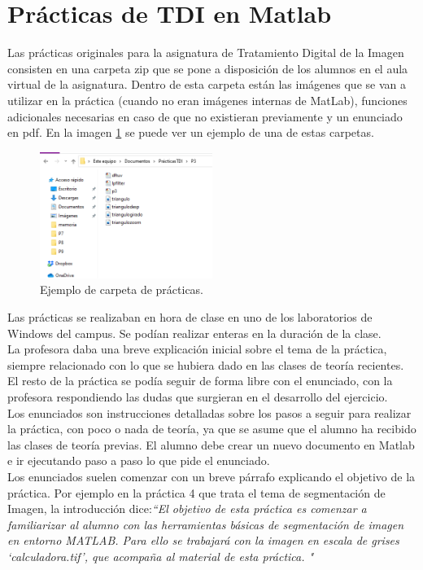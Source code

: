 \documentclass[a4paper,12pt]{report}
\begin{document}
\section{Prácticas de TDI en Matlab}


Las prácticas originales para la asignatura de Tratamiento Digital de la Imagen consisten en una carpeta zip que se pone a disposición de los alumnos en el aula virtual de la asignatura. Dentro de esta carpeta están las imágenes que se van a utilizar en la práctica (cuando no eran imágenes internas de MatLab), funciones adicionales necesarias en caso de que no existieran previamente y un enunciado en pdf. En la imagen \ref{carpetapracticas} se puede ver un ejemplo de una de estas carpetas.
 
\begin{figure}[h]
\centering
\includegraphics[width=0.5\textwidth]{imagenes/carpetapracticas}
\caption{Ejemplo de carpeta de prácticas.}
\label{carpetapracticas}
\end{figure}

Las prácticas se realizaban en hora de clase en uno de los laboratorios de Windows del campus. Se podían realizar enteras en la duración de la clase. \\

La profesora daba una breve explicación inicial sobre el tema de la práctica, siempre relacionado con lo que se hubiera dado en las clases de teoría recientes. El resto de la práctica se podía seguir de forma libre con el enunciado, con la profesora respondiendo las dudas que surgieran en el desarrollo del ejercicio. \\

Los enunciados son instrucciones detalladas sobre los pasos a seguir para realizar la práctica, con poco o nada de teoría, ya que se asume que el alumno ha recibido las clases de teoría previas. El alumno debe crear un nuevo documento en Matlab e ir ejecutando paso a paso lo que pide el enunciado. \\

Los enunciados suelen comenzar con un breve párrafo explicando el objetivo de la práctica. Por ejemplo en la práctica 4 que trata el tema de segmentación de Imagen, la introducción dice:\emph{``El objetivo de esta práctica es comenzar a familiarizar al alumno con las herramientas básicas de segmentación de imagen en entorno MATLAB. Para ello se trabajará con la imagen en escala de
grises ‘calculadora.tif’, que acompaña al material de esta práctica. "}\\
\end{document}
